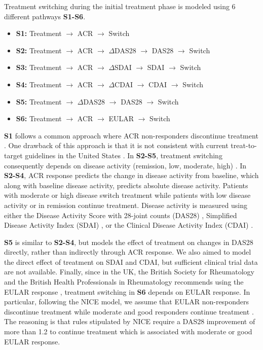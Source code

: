 \documentclass[11pt,final,fleqn]{article}\usepackage[]{graphicx}\usepackage[]{color}
\theoremstyle{plain}
\begin{document}
Treatment switching during the initial treatment phase is modeled using 6 different pathways \textbf{S1-S6}.

\begin{itemize}
\item \textbf{S1:} Treatment $\rightarrow$ ACR $\rightarrow$ Switch
\item \textbf{S2:} Treatment $\rightarrow$ ACR $\rightarrow$ $\Delta$DAS28 $\rightarrow$ DAS28 $\rightarrow$ Switch 
\item \textbf{S3:} Treatment $\rightarrow$ ACR $\rightarrow$ $\Delta$SDAI $\rightarrow$ SDAI $\rightarrow$ Switch 
\item \textbf{S4:} Treatment $\rightarrow$ ACR $\rightarrow$ $\Delta$CDAI $\rightarrow$ CDAI $\rightarrow$ Switch 
\item \textbf{S5:} Treatment $\rightarrow$ $\Delta$DAS28 $\rightarrow$ DAS28 $\rightarrow$ Switch 
\item \textbf{S6:} Treatment $\rightarrow$ ACR $\rightarrow$ EULAR $\rightarrow$ Switch
\end{itemize}

\textbf{S1} follows a common approach where ACR non-responders discontinue treatment \citep[e.g.][]{carlson2015economic, icer2017tim}. One drawback of this approach is that it is not consistent with current treat-to-target guidelines in the United States \citep{singh20162015}. In \textbf{S2-S5}, treatment switching consequently depends on disease activity (remission, low, moderate, high) \citep{anderson2012rheumatoid}. In \textbf{S2-S4}, ACR response predicts the change in disease activity from baseline, which along with baseline disease activity, predicts absolute disease activity. Patients with moderate or high disease switch treatment while patients with low disease activity or in remission continue treatment. Disease activity is measured using either the Disease Activity Score with 28-joint counts (DAS28) \citep{prevoo1995modified}, Simplified Disease Activity Index (SDAI) \citep{smolen2003simplified, aletaha2005simplified}, or the Clinical Disease Activity Index (CDAI) \citep{aletaha2005acute}. 

\textbf{S5} is similar to \textbf{S2-S4}, but models the effect of treatment on changes in DAS28 directly, rather than indirectly through ACR response. We also aimed to model the direct effect of treatment on SDAI and CDAI, but sufficient clinical trial data are not available. Finally, since in the UK, the British Society for Rheumatology and the British Health Professionals in Rheumatology recommends using the EULAR response \citep{deighton2010bsr}, treatment switching in \textbf{S6} depends on EULAR response. In particular, following the NICE model, we assume that EULAR non-responders discontinue treatment while moderate and good responders continue treatment \citep{stevenson2016adalimumab}. The reasoning is that rules stipulated by NICE require a DAS28 improvement of more than 1.2 to continue treatment which is associated with moderate or good EULAR response. 
\end{document}
